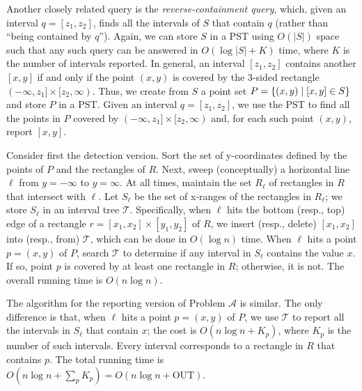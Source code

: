 \documentclass[sigconf]{acmart}
\def\vgap{\vspace{0mm}}
\def\extraspacing{\vspace{1.5mm} \noindent}
\def\T{\mathcal{T}}
\def\out{\mathrm{OUT}}
\begin{document}
{{{\vgap

Another closely related query is the {\em reverse-containment query}, which, given an interval $q = [z_1, z_2]$, finds all the intervals of $S$ that contain $q$ (rather than ``being contained by $q$''). Again, we can store $S$ in a PST using $O(|S|)$ space such that any such query can be answered in $O(\log |S| + K)$ time, where $K$ is the number of intervals reported. In general, an interval $[z_1, z_2]$ contains another $[x, y]$ if and only if the point $(x, y)$ is covered by the 3-sided rectangle $(-\infty, z_1] \times [z_2, \infty)$. Thus, we create from $S$ a point set $P = \{(x, y) \mid [x, y] \in S\}$ and store $P$ in a PST. Given an interval $q = [z_1, z_2]$, we use the PST to find all the points in $P$ covered by $(-\infty, z_1] \times [z_2, \infty)$ and, for each such point $(x, y)$, report $[x, y]$.

\extraspacing {\bf Algorithm for Problem $\bm{\mathscr{A}}$.} Consider first the detection version. Sort the set of y-coordinates defined by the points of $P$ and the rectangles of $R$. Next, sweep (conceptually) a horizontal line $\ell$ from $y = -\infty$ to $y = \infty$. At all times, maintain the set $R_\ell$ of rectangles in $R$ that intersect with $\ell$. Let $S_\ell$ be the set of x-ranges of the rectangles in $R_\ell$; we store $S_\ell$ in an interval tree $\T$. Specifically, when $\ell$ hits the bottom (resp., top) edge of a rectangle $r = [x_1, x_2] \times [y_1, y_2]$ of $R$, we insert (resp., delete) $[x_1, x_2]$ into (resp., from) $\T$, which can be done in $O(\log n)$ time. When $\ell$ hits a point $p = (x, y)$ of $P$, search $\T$ to determine if any interval in $S_\ell$ contains the value $x$. If so, point $p$ is covered by at least one rectangle in $R$; otherwise, it is not. The overall running time is $O(n \log n)$.

\vgap

The algorithm for the reporting version of Problem $\mathscr{A}$ is similar. The only difference is that, when $\ell$ hits a point $p = (x, y)$ of $P$, we use $\T$ to report all the intervals in $S_\ell$ that contain $x$; the cost is $O(n \log n + K_p)$, where $K_p$ is the number of such intervals. Every interval corresponds to a rectangle in $R$ that contains $p$. The total running time is $O(n \log n + \sum_p K_p) = O(n \log n + \out)$.

}}}
\end{document}
